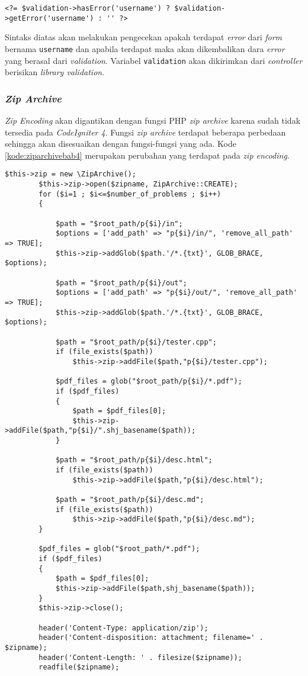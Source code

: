 \begin{center}
\verb|<?= $validation->hasError('username') ? $validation->getError('username') : '' ?>|
\end{center}

Sintaks diatas akan melakukan pengecekan apakah terdapat \textit{error} dari \textit{form} bernama \texttt{username} dan apabila terdapat maka akan dikembalikan dara \textit{error} yang berasal dari \textit{validation}. Variabel \texttt{validation} akan dikirimkan dari \textit{controller} berisikan \textit{library validation}.

\subsubsection{\textit{Zip Archive}}
\textit{Zip Encoding} akan digantikan dengan fungsi PHP \textit{zip archive} karena sudah tidak tersedia pada \textit{CodeIgniter 4}. Fungsi \textit{zip archive} terdapat beberapa perbedaan sehingga akan disesuaikan dengan fungsi-fungsi yang ada. Kode \ref{kode:ziparchivebab4} merupakan perubahan yang terdapat pada \textit{zip encoding}.

\begin{lstlisting}[caption=Perancangan perubahan \textit{zip encoding} menjadi \textit{zip archive}, label=kode:ziparchivebab4]
$this->zip = new \ZipArchive();
		$this->zip->open($zipname, ZipArchive::CREATE);
		for ($i=1 ; $i<=$number_of_problems ; $i++)
		{

			$path = "$root_path/p{$i}/in";
			$options = ['add_path' => "p{$i}/in/", 'remove_all_path' => TRUE];
			$this->zip->addGlob($path.'/*.{txt}', GLOB_BRACE, $options);

			$path = "$root_path/p{$i}/out";
			$options = ['add_path' => "p{$i}/out/", 'remove_all_path' => TRUE];
			$this->zip->addGlob($path.'/*.{txt}', GLOB_BRACE, $options);

			$path = "$root_path/p{$i}/tester.cpp";
			if (file_exists($path))
				$this->zip->addFile($path,"p{$i}/tester.cpp");

			$pdf_files = glob("$root_path/p{$i}/*.pdf");
			if ($pdf_files)
			{
				$path = $pdf_files[0];
				$this->zip->addFile($path,"p{$i}/".shj_basename($path));
			}

			$path = "$root_path/p{$i}/desc.html";
			if (file_exists($path))
				$this->zip->addFile($path,"p{$i}/desc.html");

			$path = "$root_path/p{$i}/desc.md";
			if (file_exists($path))
				$this->zip->addFile($path,"p{$i}/desc.md");
		}

		$pdf_files = glob("$root_path/*.pdf");
		if ($pdf_files)
		{
			$path = $pdf_files[0];
			$this->zip->addFile($path,shj_basename($path));
		}
		$this->zip->close();
		
		header('Content-Type: application/zip');
		header('Content-disposition: attachment; filename=' . $zipname);
		header('Content-Length: ' . filesize($zipname));
		readfile($zipname);
\end{lstlisting}

